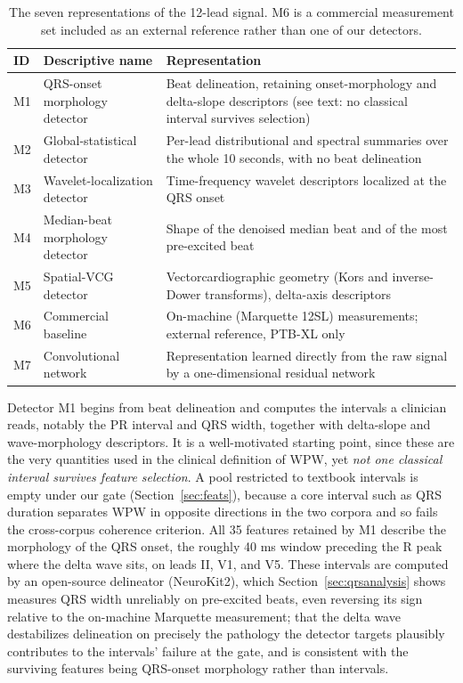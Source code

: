 \documentclass[11pt]{article}
\begin{document}
\begin{table}[t]
  \centering
  \small
  \caption{The seven representations of the 12-lead signal. M6 is a commercial measurement set included as an external reference rather than one of our detectors.}
  \label{tab:nomenclature}
  \begin{tabular}{@{}llp{7.0cm}@{}}
    \toprule
    ID & Descriptive name & Representation \\
    \midrule
    M1 & QRS-onset morphology detector & Beat delineation, retaining onset-morphology and delta-slope descriptors (see text: no classical interval survives selection) \\
    M2 & Global-statistical detector & Per-lead distributional and spectral summaries over the whole 10 seconds, with no beat delineation \\
    M3 & Wavelet-localization detector & Time-frequency wavelet descriptors localized at the QRS onset \\
    M4 & Median-beat morphology detector & Shape of the denoised median beat and of the most pre-excited beat \\
    M5 & Spatial-VCG detector & Vectorcardiographic geometry (Kors and inverse-Dower transforms), delta-axis descriptors \\
    M6 & Commercial baseline & On-machine (Marquette 12SL) measurements; external reference, PTB-XL only \\
    M7 & Convolutional network & Representation learned directly from the raw signal by a one-dimensional residual network \\
    \bottomrule
  \end{tabular}
\end{table}

Detector M1 begins from beat delineation and computes the intervals a clinician reads, notably the PR interval and QRS width, together with delta-slope and wave-morphology descriptors. It is a well-motivated starting point, since these are the very quantities used in the clinical definition of WPW, yet \emph{not one classical interval survives feature selection}. A pool restricted to textbook intervals is empty under our gate (Section~\ref{sec:feats}), because a core interval such as QRS duration separates WPW in opposite directions in the two corpora and so fails the cross-corpus coherence criterion. All 35 features retained by M1 describe the morphology of the QRS onset, the roughly 40 ms window preceding the R peak where the delta wave sits, on leads II, V1, and V5. These intervals are computed by an open-source delineator (NeuroKit2), which Section~\ref{sec:qrsanalysis} shows measures QRS width unreliably on pre-excited beats, even reversing its sign relative to the on-machine Marquette measurement; that the delta wave destabilizes delineation on precisely the pathology the detector targets plausibly contributes to the intervals' failure at the gate, and is consistent with the surviving features being QRS-onset morphology rather than intervals.
\end{document}

